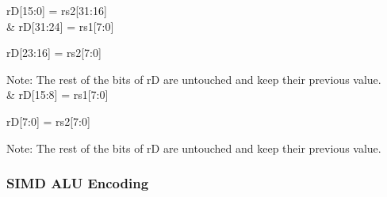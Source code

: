 \documentclass[letterpaper,10pt,english]{sphinxmanual}
\begin{document}
\begin{savenotes}
\begin{tabular}[t]{}
\sphinxAtStartPar
rD{[}15:0{]} = rs2{[}31:16{]}
\\
\sphinxhline
\sphinxAtStartPar
{}
&
\sphinxAtStartPar
rD{[}31:24{]} = rs1{[}7:0{]}

\sphinxAtStartPar
rD{[}23:16{]} = rs2{[}7:0{]}

\sphinxAtStartPar
Note: The rest of the bits of rD are untouched and keep their previous value.
\\
\sphinxhline
\sphinxAtStartPar
{}
&
\sphinxAtStartPar
rD{[}15:8{]} = rs1{[}7:0{]}

\sphinxAtStartPar
rD{[}7:0{]} = rs2{[}7:0{]}

\sphinxAtStartPar
Note: The rest of the bits of rD are untouched and keep their previous value.
\\
\sphinxbottomrule
\end{tabular}
\sphinxtableafterendhook\par
\sphinxattableend\end{savenotes}


\subsubsection{SIMD ALU Encoding}
\label{\detokenize{instruction_set_extensions:simd-alu-encoding}}
\end{document}
